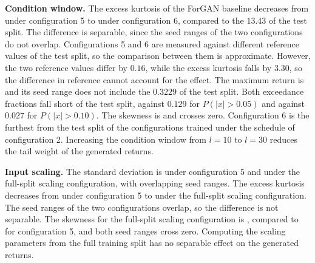 \textbf{Condition window.} The excess kurtosis of the ForGAN baseline decreases from  under configuration 5 to  under configuration 6, compared to the $13.43$ of the test split. The difference is separable, since the seed ranges of the two configurations do not overlap. Configurations 5 and 6 are measured against different reference values of the test split, so the comparison between them is approximate. However, the two reference values differ by $0.16$, while the excess kurtosis falls by $3.30$, so the difference in reference cannot account for the effect. The maximum return is  and its seed range does not include the $0.3229$ of the test split. Both exceedance fractions fall short of the test split,  against $0.129$ for $P(|x| > 0.05)$ and  against $0.027$ for $P(|x| > 0.10)$. The skewness is  and crosses zero. Configuration 6 is the furthest from the test split of the configurations trained under the schedule of configuration 2. Increasing the condition window from $l=\num{10}$ to $l=\num{30}$ reduces the tail weight of the generated returns.

\textbf{Input scaling.} The standard deviation is  under configuration 5 and  under the full-split scaling configuration, with overlapping seed ranges. The excess kurtosis decreases from  under configuration 5 to  under the full-split scaling configuration. The seed ranges of the two configurations overlap, so the difference is not separable. The skewness for the full-split scaling configuration is , compared to  for configuration 5, and both seed ranges cross zero. Computing the scaling parameters from the full training split has no separable effect on the generated returns.

